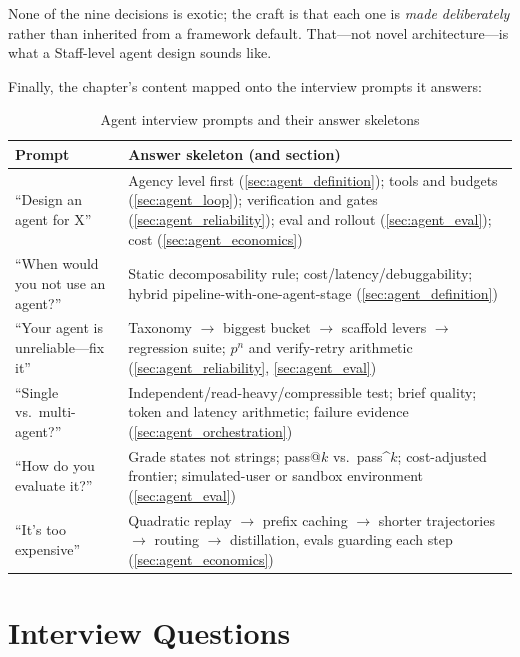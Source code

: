 None of the nine decisions is exotic; the craft is that each one is \textit{made deliberately} rather than inherited from a framework default. That---not novel architecture---is what a Staff-level agent design sounds like.

Finally, the chapter's content mapped onto the interview prompts it answers:

\begin{table}[H]
\centering
\caption{Agent interview prompts and their answer skeletons}
\label{tab:agent_prompt_map}
\begin{tabularx}{\textwidth}{p{5.4cm}X}
\toprule
\textbf{Prompt} & \textbf{Answer skeleton (and section)} \\
\midrule
``Design an agent for X'' & Agency level first (\ref{sec:agent_definition}); tools and budgets (\ref{sec:agent_loop}); verification and gates (\ref{sec:agent_reliability}); eval and rollout (\ref{sec:agent_eval}); cost (\ref{sec:agent_economics}) \\
``When would you not use an agent?'' & Static decomposability rule; cost/latency/debuggability; hybrid pipeline-with-one-agent-stage (\ref{sec:agent_definition}) \\
``Your agent is unreliable---fix it'' & Taxonomy $\rightarrow$ biggest bucket $\rightarrow$ scaffold levers $\rightarrow$ regression suite; $p^n$ and verify-retry arithmetic (\ref{sec:agent_reliability}, \ref{sec:agent_eval}) \\
``Single vs.\ multi-agent?'' & Independent/read-heavy/compressible test; brief quality; token and latency arithmetic; failure evidence (\ref{sec:agent_orchestration}) \\
``How do you evaluate it?'' & Grade states not strings; pass@$k$ vs.\ pass\textasciicircum{}$k$; cost-adjusted frontier; simulated-user or sandbox environment (\ref{sec:agent_eval}) \\
``It's too expensive'' & Quadratic replay $\rightarrow$ prefix caching $\rightarrow$ shorter trajectories $\rightarrow$ routing $\rightarrow$ distillation, evals guarding each step (\ref{sec:agent_economics}) \\
\bottomrule
\end{tabularx}
\end{table}

\section{Interview Questions}
\label{sec:agents_interview}

